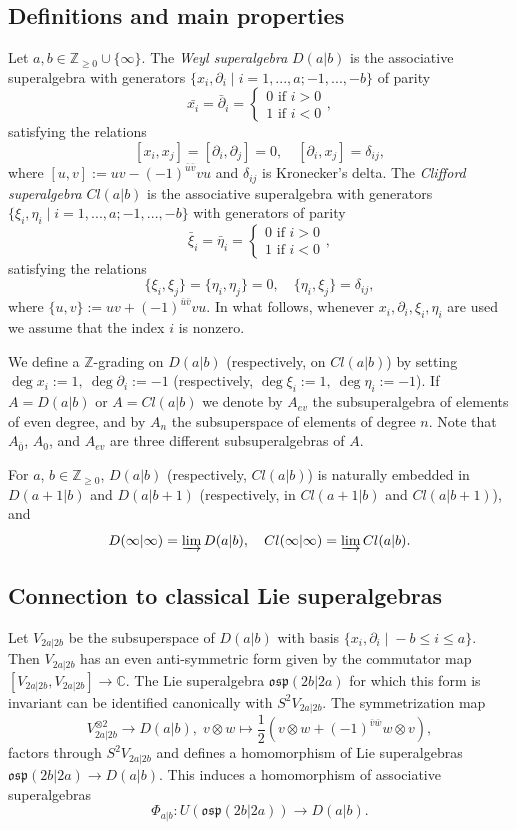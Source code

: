 \documentclass[12pt]{amsart}
\theoremstyle{plain} %
\numberwithin{equation}{section}
\theoremstyle{definition}
\theoremstyle{remark}
\theoremstyle{plain} %
\newcommand{\osp}{\mathfrak{osp}}
\newcommand{\Z}{\mathbb{Z}}
\begin{document}
\subsection{Definitions and main properties}
Let $a,b \in \Z_{\geq 0} \cup \{ \infty \}$. The \emph{Weyl superalgebra} $D(a|b)$ is the associative superalgebra with generators $\{x_i,\partial_i\mid i =1,...,a; -1,...,-b\}$ of  parity
$$\bar{x_i}=\bar{\partial}_i=\begin{cases} 0\,\,\text{if}\,\,i > 0\\ 1\,\,\text{if}\,\,i<0\end{cases},$$
satisfying the relations
$$[x_i,x_j]=[\partial_i,\partial_j]=0,\quad[\partial_i,x_j]=\delta_{ij},$$
where $[u,v]:=uv-(-1)^{\bar{u}\bar{v}}vu$ and  $\delta_{ij}$ is  Kronecker's delta.  The \emph{Clifford superalgebra} $Cl(a|b)$ is the associative superalgebra with generators $\{\xi_i,\eta_i\mid i =1,...,a; -1,...,-b \}$ with generators of parity
$$\bar{\xi}_i=\bar{\eta}_i=\begin{cases} 0\,\,\text{if}\,\,i > 0\\ 1\,\,\text{if}\,\,i<0\end{cases},$$
satisfying the relations
$$\{\xi_i,\xi_j\}=\{\eta_i,\eta_j\}=0,\quad\{\eta_i,\xi_j\}=\delta_{ij},$$
where $\{u,v\}:=uv+(-1)^{\bar{u}\bar{v}}vu$. In what follows, whenever $x_i, \partial_i, \xi_i,\eta_i$ are used we assume that the index $i$ is nonzero. 

We define a $\mathbb Z$-grading on $D(a|b)$ (respectively, on $Cl(a|b)$) by setting $\operatorname{deg} x_i:=1,\ \operatorname{deg} \partial_i:=-1$ (respectively, $\operatorname{deg} \xi_i:=1,\ \operatorname{deg} \eta_i:=-1$).
If $A=D(a|b)$ or $A=Cl(a|b)$ we denote by $A_{ev}$ the subsuperalgebra of elements of even degree, and by $A_n$ the subsuperspace of elements of degree $n$. Note that $A_{\bar{0}}$, $A_{0}$, and $A_{ev}$ are three different subsuperalgebras of $A$.


For $a$, $b\in\mathbb{Z}_{\geq 0}$, $D(a|b)$ (respectively, $Cl(a|b)$)  is naturally embedded in $D(a+1|b)$ and $D(a|b+1)$ (respectively, in $Cl(a+1|b)$ and $Cl(a|b+1)$), and 
$$D(\infty|\infty)=\varinjlim D(a|b),\quad Cl(\infty|\infty)=\varinjlim Cl(a|b).$$


\subsection{Connection to classical Lie superalgebras} \label{sebsec-conn}
Let $V_{2a|2b}$ be the subsuperspace of $D(a|b)$ with basis $\{x_i,\partial_i \; | \; -b \leq i \leq  a \}$. Then $V_{2a|2b}$ has an even anti-symmetric form given by the commutator map $[V_{2a|2b},V_{2a|2b}]\to\mathbb C$. The Lie superalgebra
$\osp(2b|2a)$ %
for which this form is invariant can be identified canonically with $S^2 V_{2a|2b} $. The symmetrization map 
$$
V_{2a|2b}^{\otimes 2} \to D(a|b), \; v\otimes w \mapsto \frac{1}{2} \left( v\otimes w  + (-1)^{\bar{v}\bar{w}} w \otimes v\right),
$$ 
factors through  $S^2 V_{2a|2b}$  and  defines a homomorphism of Lie superalgebras \\
$\osp(2b|2a) \to D(a|b).$ This   
induces a homomorphism of associative superalgebras $$\Phi_{a|b}:U(\osp(2b|2a))\to D(a|b).$$
\end{document}
